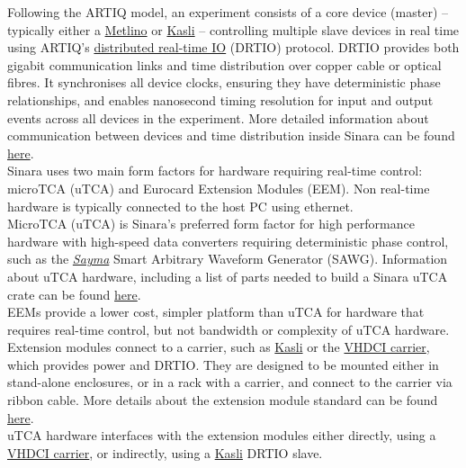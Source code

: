 Following the ARTIQ model, an experiment consists of a core device
(master) -- typically either a \url{Metlino} or \url{Kasli} --
controlling multiple slave devices in real time using ARTIQ's
\href{https://github.com/m-labs/artiq/wiki/DRTIO}{distributed real-time
IO} (DRTIO) protocol. DRTIO provides both gigabit communication links
and time distribution over copper cable or optical fibres. It
synchronises all device clocks, ensuring they have deterministic phase
relationships, and enables nanosecond timing resolution for input and
output events across all devices in the experiment. More detailed
information about communication between devices and time distribution
inside Sinara can be found \href{SinaraClocking}{here}.\\

Sinara uses two main form factors for hardware requiring real-time
control: microTCA (uTCA) and Eurocard Extension Modules (EEM). Non
real-time hardware is typically connected to the host PC using ethernet.\\

MicroTCA (uTCA) is Sinara's preferred form factor for high performance
hardware with high-speed data converters requiring deterministic phase
control, such as the \href{Sayma}{\emph{Sayma}} Smart Arbitrary Waveform
Generator (SAWG). Information about uTCA hardware, including a list of
parts needed to build a Sinara uTCA crate can be found
\href{uTCA}{here}.\\

EEMs provide a lower cost, simpler platform than uTCA for hardware that
requires real-time control, but not bandwidth or complexity of uTCA
hardware.\\

Extension modules connect to a carrier, such as \url{Kasli} or the
\href{VHDCICarrier}{VHDCI carrier}, which provides power and DRTIO. They
are designed to be mounted either in stand-alone enclosures, or in a
rack with a carrier, and connect to the carrier via ribbon cable. More
details about the extension module standard can be found
\href{EEM}{here}.\\

uTCA hardware interfaces with the extension modules either directly,
using a \href{VHDCICarrier}{VHDCI carrier}, or indirectly, using a
\url{Kasli} DRTIO slave.
